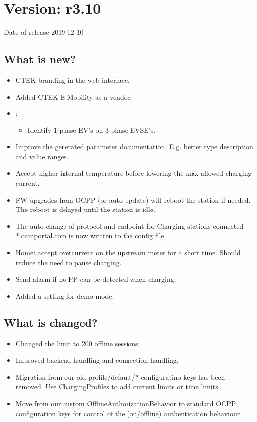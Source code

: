 \documentclass{scrartcl}
\begin{document}
\section{Version: r3.10}
Date of release 2019-12-10

\subsection*{What is new?}

\begin{itemize}
\item CTEK branding in the web interface.
\item Added CTEK E-Mobility as a vendor.
\item \nanogrid:
  \begin{itemize}
  \item Identify 1-phase EV's on 3-phase EVSE's.
  \end{itemize}
\item Improve the generated parameter documentation. E.g. better type
  description and value ranges.
\item Accept higher internal temperature before lowering the max allowed
  charging current.
\item FW upgrades from OCPP (or \nanogrid auto-update) will reboot the station
  if needed. The reboot is delayed until the station is idle.
\item The auto change of protocol and endpoint for Charging stations connected
  *.oamportal.com is now written to the config file.
\item \nanogrid Home: accept overcurrent on the upstream meter for a short
  time. Should reduce the need to pause charging.
\item Send alarm if no PP can be detected when charging.
\item Added a setting for demo mode.
\end{itemize}

\subsection*{What is changed?}

\begin{itemize}
\item Changed the limit to 200 offline sessions.
\item Improved backend handling and connection handling.
\item Migration from our old profile/default/* configuratino keys has been
  removed. Use ChargingProfiles to add current limits or time limits.
\item Move from our custom OfflineAuthorizationBehavior to standard OCPP
  configuration keys for control of the (on/offline) authentication behaviour.
\end{itemize}
\end{document}
